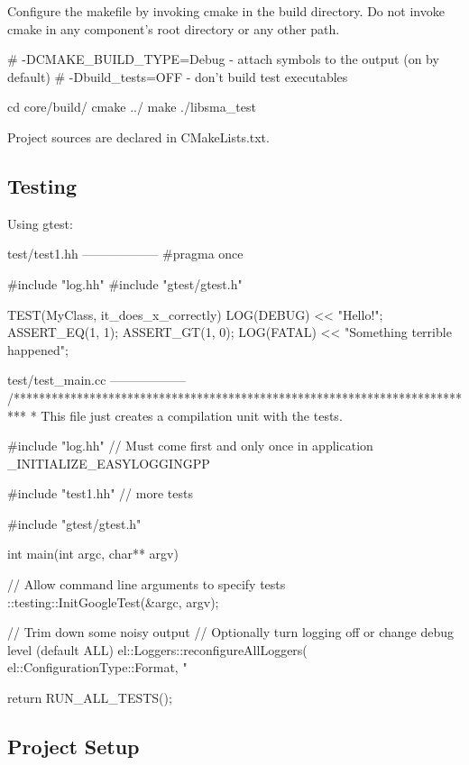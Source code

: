 Configure the makefile by invoking {\ttfamily cmake} in the build directory. Do not invoke {\ttfamily cmake} in any component's root directory or any other path. \begin{DoxyVerb} # -DCMAKE_BUILD_TYPE=Debug - attach symbols to the output (on by default)
 # -Dbuild_tests=OFF        - don't build test executables

 cd core/build/
 cmake ../
 make
 ./libsma_test
\end{DoxyVerb}


Project sources are declared in {\ttfamily C\-Make\-Lists.\-txt}.

\subsection*{Testing}

Using gtest\-: \begin{DoxyVerb}test/test1.hh
------------------
#pragma once

#include "log.hh"
#include "gtest/gtest.h"

TEST(MyClass, it_does_x_correctly)
{
  LOG(DEBUG) << "Hello!";
  ASSERT_EQ(1, 1);
  ASSERT_GT(1, 0);
  LOG(FATAL) << "Something terrible happened";
}

test/test_main.cc
------------------
/**************************************************************************
 * This file just creates a compilation unit with the tests.

#include "log.hh"
// Must come first and only once in application 
_INITIALIZE_EASYLOGGINGPP

#include "test1.hh"
// more tests

#include "gtest/gtest.h"

int main(int argc, char** argv)
{
  // Allow command line arguments to specify tests
  ::testing::InitGoogleTest(&argc, argv);

  // Trim down some noisy output
  // Optionally turn logging off or change debug level (default ALL)
  el::Loggers::reconfigureAllLoggers(
    el::ConfigurationType::Format,
    "%

  return RUN_ALL_TESTS();
}
\end{DoxyVerb}


\subsection*{Project Setup}


